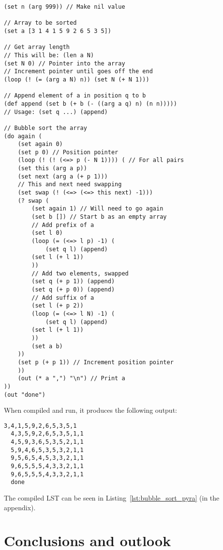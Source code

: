 \documentclass[aip,jcp,reprint,footinbib]{revtex4-1}
\newcommand\psll{\texttt{psll}\xspace}
\begin{document}
\begin{lstlisting}[language=psll,aboveskip=3mm,belowskip=3mm,
    label=lst:bubble_sort_psll,caption={
        Bubbble sort of an array in \psll. For demonstration purposes the array has been hardcoded.
    }]
(set n (arg 999)) // Make nil value

// Array to be sorted
(set a [3 1 4 1 5 9 2 6 5 3 5])

// Get array length
// This will be: (len a N)
(set N 0) // Pointer into the array
// Increment pointer until goes off the end
(loop (! (= (arg a N) n)) (set N (+ N 1)))

// Append element of a in position q to b
(def append (set b (+ b (- ((arg a q) n) (n n)))))
// Usage: (set q ...) (append)

// Bubble sort the array
(do again (
    (set again 0)
    (set p 0) // Position pointer
    (loop (! (! (<=> p (- N 1)))) ( // For all pairs
    (set this (arg a p))
    (set next (arg a (+ p 1)))
    // This and next need swapping
    (set swap (! (<=> (<=> this next) -1)))
    (? swap (
        (set again 1) // Will need to go again
        (set b []) // Start b as an empty array
        // Add prefix of a
        (set l 0)
        (loop (= (<=> l p) -1) (
            (set q l) (append)
        (set l (+ l 1))
        ))
        // Add two elements, swapped
        (set q (+ p 1)) (append)
        (set q (+ p 0)) (append)
        // Add suffix of a
        (set l (+ p 2))
        (loop (= (<=> l N) -1) (
            (set q l) (append)
        (set l (+ l 1))
        ))
        (set a b)
    ))
    (set p (+ p 1)) // Increment position pointer
    ))
    (out (* a ",") "\n") // Print a
))
(out "done")
\end{lstlisting}

When compiled and run, it produces the following output:
\begin{lstlisting}[aboveskip=3pt,belowskip=-2pt,frame=none,numbers=none]
  3,4,1,5,9,2,6,5,3,5,1
  4,3,5,9,2,6,5,3,5,1,1
  4,5,9,3,6,5,3,5,2,1,1
  5,9,4,6,5,3,5,3,2,1,1
  9,5,6,5,4,5,3,3,2,1,1
  9,6,5,5,5,4,3,3,2,1,1
  9,6,5,5,5,4,3,3,2,1,1
  done
\end{lstlisting}
The compiled LST can be seen in Listing~\ref{lst:bubble_sort_pyra} (in the appendix).

\section{Conclusions and outlook}\label{sec:conclusions}
\end{document}
